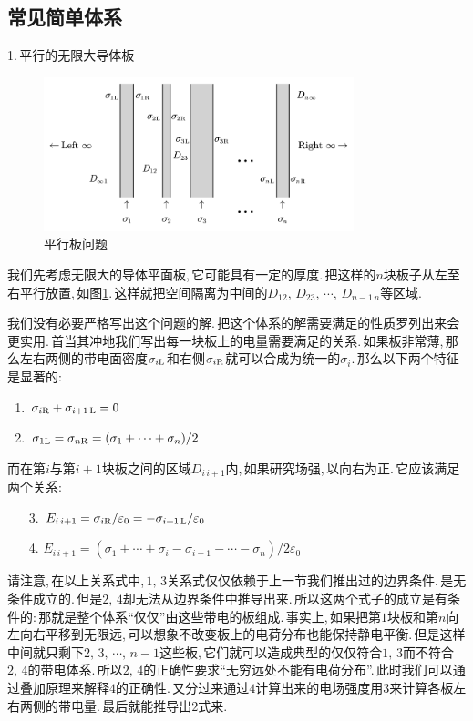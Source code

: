 \subsection{常见简单体系}

1.\,平行的无限大导体板

\begin{figure}
\vspace{-0.2cm}
\centering
\includegraphics[width=9cm]{image/7-2-6.png}
\caption{平行板问题}\label{fig7-2-6}
\end{figure}
我们先考虑无限大的导体平面板,\,它可能具有一定的厚度.\,把这样的$n$块板子从左至右平行放置,\,如图\ref{fig7-2-6}.\,这样就把空间隔离为中间的$D_{12},\,D_{23},\,\cdots,\,D_{n-1\,n}$等区域.

我们没有必要严格写出这个问题的解.\,把这个体系的解需要满足的性质罗列出来会更实用.\,首当其冲地我们写出每一块板上的电量需要满足的关系.\,如果板非常薄,\,那么左右两侧的带电面密度$\sigma_{i{\rm L}}$和右侧$\sigma_{i{\rm R}}$就可以合成为统一的$\sigma_i$.\,那么以下两个特征是显著的:
\begin{enumerate}
\item $\sigma_{i{\rm R}}+\sigma_{i+1\,{\rm L}}=0$
\item $\sigma_{1{\rm L}}=\sigma_{n{\rm R}}=(\sigma_1+\cdots+\sigma_n)/2$
\end{enumerate}

而在第$i$与第$i+1$块板之间的区域$D_{i\,i+1}$内,\,如果研究场强,\,以向右为正.\,它应该满足两个关系:
\begin{enumerate}
\item[3.] $E_{i\,i+1}=\sigma_{i{\rm R}}/\varepsilon_0=-\sigma_{i+1\,{\rm L}}/\varepsilon_0$
\item[4.] $E_{i\,i+1}=(\sigma_1+\cdots+\sigma_i-\sigma_{i+1}-\cdots-\sigma_n)/2\varepsilon_0$
\end{enumerate}


请注意,\,在以上关系式中,\,$1,\,3$关系式仅仅依赖于上一节我们推出过的边界条件.\,是无条件成立的.\,但是$2,\,4$却无法从边界条件中推导出来.\,所以这两个式子的成立是有条件的:\,那就是整个体系``仅仅''由这些带电的板组成.\,事实上,\,如果把第$1$块板和第$n$向左向右平移到无限远,\,可以想象不改变板上的电荷分布也能保持静电平衡.\,但是这样中间就只剩下$2,\,3,\,\cdots,\,n-1$这些板,\,它们就可以造成典型的仅仅符合$1,\,3$而不符合$2,\,4$的带电体系.\,所以$2,\,4$的正确性要求``无穷远处不能有电荷分布''.\,此时我们可以通过叠加原理来解释$4$的正确性.\,又分过来通过$4$计算出来的电场强度用$3$来计算各板左右两侧的带电量.\,最后就能推导出$2$式来.

